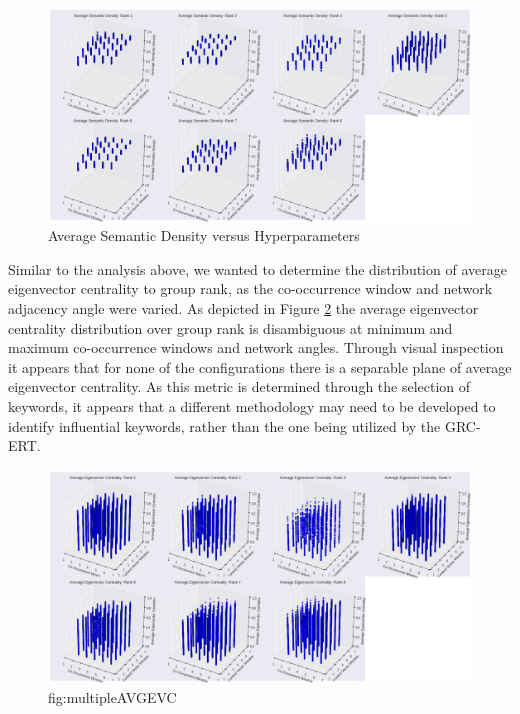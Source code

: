 \documentclass[11pt]{article}
\begin{document}
\begin{figure}[h]
\begin{center}
\includegraphics[width = \textwidth]{figs/multipleAVGSD}
\caption{Average Semantic Density versus Hyperparameters}
\label{fig:multipleAVGSD}
\end{center}
\end{figure}

Similar to the analysis above, we wanted to determine the distribution of average eigenvector centrality to group rank, as the co-occurrence window and network adjacency angle were varied. As depicted in Figure \ref{fig:multipleAVGEVC} the average eigenvector centrality distribution over group rank is disambiguous at minimum and maximum co-occurrence windows and network angles. Through visual inspection it appears that for none of the configurations there is a separable plane of average eigenvector centrality. As this metric is determined through the selection of keywords, it appears that a different methodology may need to be developed to identify influential keywords, rather than the one being utilized by the GRC-ERT.

\begin{figure}[h]
\begin{center}
\includegraphics[width = \textwidth]{figs/multipleAVGEVC}
\caption{fig:multipleAVGEVC}
\label{fig:multipleAVGEVC}
\end{center}
\end{figure}
\end{document}
